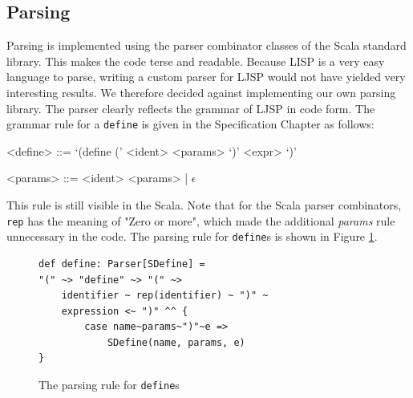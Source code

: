 \documentclass[11pt]{report}
\begin{document}
\subsection{Parsing}
Parsing is implemented using the parser combinator classes of the Scala standard library. This makes the code terse and readable. Because LISP is a very easy language to parse, writing a custom parser for LJSP would not have yielded very interesting results. We therefore decided against implementing our own parsing library. The parser clearly reflects the grammar of LJSP in code form. The grammar rule for a \texttt{define} is given in the Specification Chapter as follows:

\begin{grammar}
<define> ::= `(define (' <ident> <params> `)' <expr> `)'

<params> ::= <ident> <params> | $\epsilon$
\end{grammar}

This rule is still visible in the Scala. Note that for the Scala parser combinators, \texttt{rep} has the meaning of "Zero or more", which made the additional \textit{params} rule unnecessary in the code. The parsing rule for \texttt{define}s is shown in Figure \ref{parsingrule}.

\begin{figure}[ht]
\begin{lstlisting}
def define: Parser[SDefine] = 
"(" ~> "define" ~> "(" ~> 
    identifier ~ rep(identifier) ~ ")" ~ 
    expression <~ ")" ^^ {
        case name~params~")"~e => 
            SDefine(name, params, e)
}
\end{lstlisting}
\caption{The parsing rule for \texttt{define}s}
\label{parsingrule}
\end{figure}
\end{document}
